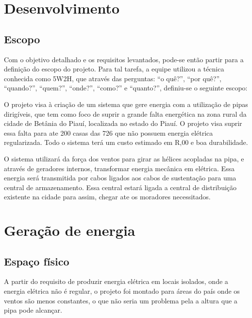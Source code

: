 \chapter[Desenvolvimento]{Desenvolvimento}

\section{Escopo}
Com o objetivo detalhado e os requisitos levantados, pode-se então partir para a definição do escopo do projeto. Para tal tarefa, a equipe utilizou a técnica conhecida como 5W2H, que através das perguntas: “o quê?”, “por quê?”, “quando?”, “quem?”, “onde?”, “como?” e “quanto?”, definiu-se o seguinte escopo:

O projeto visa à criação de um sistema que gere energia com a utilização de pipas dirigíveis, que tem como foco de suprir a grande falta energética na zona rural da cidade de Betânia do Piauí, localizada no estado do Piauí. O projeto visa suprir essa falta para ate 200 casas das 726 que não possuem energia elétrica regularizada. Todo o sistema terá um custo estimado em R,00 e boa durabilidade.

O sistema utilizará da força dos ventos para girar as hélices acopladas na pipa, e através de geradores internos, transformar energia mecânica em elétrica. Essa energia será transmitida por cabos ligados aos cabos de sustentação para uma central de armazenamento. Essa central estará ligada a central de distribuição existente na cidade para assim, chegar ate os moradores necessitados.     


\chapter{Geração de energia}

\section{Espaço físico}
 
A partir do requisito de produzir energia elétrica em locais isolados, onde a energia elétrica não é regular, o projeto foi montado para áreas do país onde os ventos são menos constantes, o que não seria um problema pela a altura que a pipa pode alcançar. 

